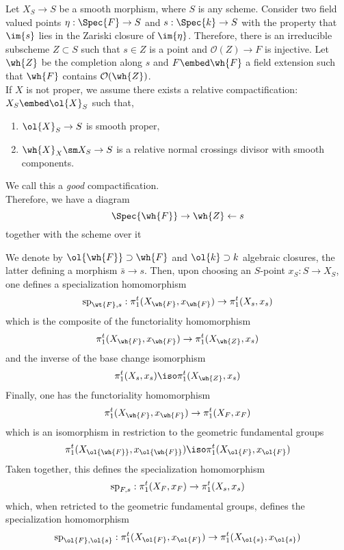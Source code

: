 \documentclass{article}
\newcommand{\cO}{\mathcal{O}}
\begin{document}
Let $X_S \to S$ be a smooth morphism, where $S$ is any scheme. Consider two field valued points $\eta : \Spec{F} \to S$ and $s : \Spec{k} \to S$ with the property that $\im{s}$ lies in the Zariski closure of $\im{\eta}$. Therefore, there is an irreducible subscheme $Z \subset S$ such that $s \in Z$ is a point and $\cO(Z) \to F$ is injective. Let $\wh{Z}$ be the completion along $s$ and $F \embed \wh{F}$ a field extension such that $\wh{F}$ contains $\cO(\wh{Z})$.
\bigskip\\
If $X$ is not proper, we assume there exists a relative compactification: $X_S \embed \ol{X}_S$ such that,
\begin{enumerate}
\item $\ol{X}_S \to S$ is smooth proper,
\item $\wh{X}_X \sm X_S \to S$ is a relative normal crossings divisor with smooth components. 
\end{enumerate}
We call this a \textit{good} compactification. 
\bigskip\\
Therefore, we have a diagram
\[ \Spec{\wh{F}} \to \wh{Z} \leftarrow s \]
together with the scheme over it
\begin{center}
\end{center}
We denote by $\ol{\wh{F}} \supset \wh{F}$ and $\ol{k} \supset k$ algebraic closures, the latter defining a morphism $\bar{s} \to s$. Then, upon choosing an $S$-point $x_S : S \to X_S$, one defines a specialization homomorphism
\[ \sp_{\wt{F}, s} : \pi^t_1(X_{\wh{F}}, x_{\wh{F}}) \to \pi^t_1(X_s, x_s) \]
which is the composite of the functoriality homomorphism
\[ \pi_1^t(X_{\wh{F}}, x_{\wh{F}}) \to \pi^t_1(X_{\wh{Z}}, x_s) \]
and the inverse of the base change isomorphism
\[ \pi_1^t(X_s, x_s) \iso \pi_1^t(X_{\wh{Z}}, x_s) \]
Finally, one has the functoriality homomorphism
\[ \pi_1^t(X_{\wh{F}}, x_{\wh{F}}) \to \pi_1^t(X_F, x_F) \]
which is an isomorphism in restriction to the geometric fundamental groups
\[ \pi^t_1(X_{\ol{\wh{F}}}, x_{\ol{\wh{F}}}) \iso \pi_1^t(X_{\ol{F}}, x_{\ol{F}}) \]
Taken together, this defines the specialization homomorphism
\[ \sp_{F,s} : \pi_1^t(X_F, x_F) \to \pi^t_1(X_s, x_s) \]
which, when retricted to the geometric fundamental groups, defines the specialization homomorphism
\[ \sp_{\ol{F}, \ol{s}} : \pi^t_1(X_{\ol{F}}, x_{\ol{F}}) \to \pi_1^t(X_{\ol{s}}, x_{\ol{s}}) \]
\end{document}
